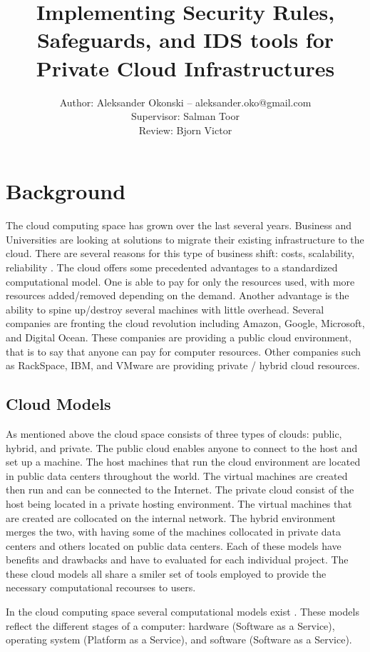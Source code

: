 \documentclass[12pt]{article}
\title{Implementing Security Rules, Safeguards, and IDS tools for Private Cloud Infrastructures}
\author{Author: Aleksander Okonski -- aleksander.oko@gmail.com \\ Supervisor: Salman Toor \\ Review: Bjorn Victor }
\date{}
\begin{document}
\maketitle
\newpage
\tableofcontents
\newpage

\section{Background}
The cloud computing space has grown over the last several years. Business and Universities are looking at solutions to migrate their existing infrastructure to the cloud. There are several reasons for this type of business shift: costs, scalability, reliability \cite{DillonWuChang}. The cloud offers some precedented advantages to a standardized computational model. One is able to pay for only the resources used, with more resources added/removed depending on the demand. Another advantage is the ability to spine up/destroy several machines with little overhead. Several companies are fronting the cloud revolution including Amazon, Google, Microsoft, and Digital Ocean. These companies are providing a public cloud environment, that is to say that anyone can pay for computer resources. Other companies such as RackSpace, IBM, and VMware are providing private / hybrid cloud resources.

\subsection{Cloud Models}
As mentioned above the cloud space consists of three types of clouds: public, hybrid, and private. The public cloud enables anyone to connect to the host and set up a machine. The host machines that run the cloud environment are located in public data centers throughout the world. The virtual machines are created then run and can be connected to the Internet.  The private cloud consist of the host being located in a private hosting environment. The virtual machines that are created are collocated on the internal network. The hybrid environment merges the two, with having some of the machines collocated in private data centers and others located on public data centers. Each of these models have benefits and drawbacks and have to evaluated for each individual project. The these cloud models all share a smiler set of tools employed to provide the necessary computational recourses to users.

In the cloud computing space several computational models exist \cite{wikipedia}. These models reflect the different stages of a computer: hardware (Software as a Service), operating system (Platform as a Service), and software (Software as a Service).
\end{document}
